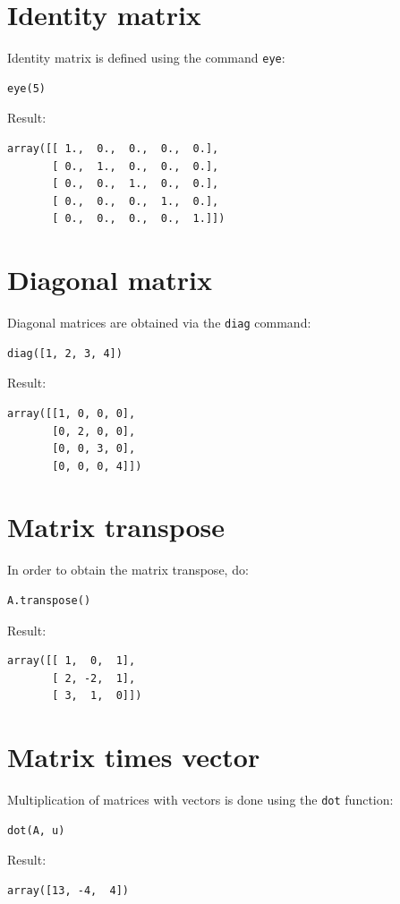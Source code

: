 \documentclass{article}
\begin{document}
\section{Identity matrix}

Identity matrix is defined using the command {\tt eye}:
\begin{verbatim}
eye(5)
\end{verbatim}
Result:
\begin{verbatim}
array([[ 1.,  0.,  0.,  0.,  0.],
       [ 0.,  1.,  0.,  0.,  0.],
       [ 0.,  0.,  1.,  0.,  0.],
       [ 0.,  0.,  0.,  1.,  0.],
       [ 0.,  0.,  0.,  0.,  1.]])
\end{verbatim}

\section{Diagonal matrix}

Diagonal matrices are obtained via the {\tt diag} command:
\begin{verbatim}
diag([1, 2, 3, 4])
\end{verbatim}
Result:
\begin{verbatim}
array([[1, 0, 0, 0],
       [0, 2, 0, 0],
       [0, 0, 3, 0],
       [0, 0, 0, 4]])
\end{verbatim}

\section{Matrix transpose}

In order to obtain the matrix transpose, do:
\begin{verbatim}
A.transpose()
\end{verbatim}
Result:
\begin{verbatim}
array([[ 1,  0,  1],
       [ 2, -2,  1],
       [ 3,  1,  0]])
\end{verbatim}

\section{Matrix times vector}

Multiplication of matrices with vectors is done using the {\tt dot} function:
\begin{verbatim}
dot(A, u)
\end{verbatim}
Result:
\begin{verbatim}
array([13, -4,  4])
\end{verbatim}
\end{document}
